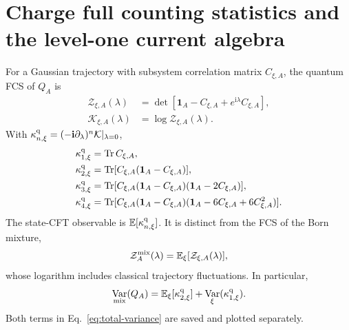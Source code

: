 \documentclass[aps,prx,twocolumn,floatfix,nofootinbib,superscriptaddress,longbibliography]{revtex4-2}
\DeclareMathOperator{\Var}{Var}
\newcommand{\ii}{\boldsymbol{\mathrm{i}}}
\newcommand{\mc}[1]{\mathcal{#1}}
\newcommand{\E}{\mathbb{E}}
\newcommand{\qTr}{\operatorname{Tr}}
\begin{document}
\section{Charge full counting statistics and the level-one current algebra}
\label{app:fcs}

For a Gaussian trajectory with subsystem correlation matrix $C_{\xi,A}$, the quantum FCS
of $Q_A$ is
\begin{equation}
 \begin{aligned}
 \mc Z_{\xi,A}(\lambda)
 &=\det\!\left[\mathbf{1}_A-C_{\xi,A}+e^{\ii\lambda}C_{\xi,A}\right],\\
 \mc K_{\xi,A}(\lambda)&=\log\mc Z_{\xi,A}(\lambda).
 \end{aligned}
\end{equation}
With $\kappa_{n,\xi}^{\rm q}=(-\ii\partial_\lambda)^n\mc K|_{\lambda=0}$,
\begin{align}
 \kappa_{1,\xi}^{\rm q}&=\qTr C_{\xi,A},\\
 \kappa_{2,\xi}^{\rm q}&=\qTr[C_{\xi,A}(\mathbf{1}_A-C_{\xi,A})],\\
 \kappa_{3,\xi}^{\rm q}&=\qTr[C_{\xi,A}(\mathbf{1}_A-C_{\xi,A})(\mathbf{1}_A-2C_{\xi,A})],\\
 \kappa_{4,\xi}^{\rm q}&=\qTr[C_{\xi,A}(\mathbf{1}_A-C_{\xi,A})
 (\mathbf{1}_A-6C_{\xi,A}+6C_{\xi,A}^2)].
\end{align}
The state-CFT observable is $\E[\kappa_{n,\xi}^{\rm q}]$.  It is distinct from the FCS of
the Born mixture,
\begin{equation}
 \mc Z_A^{\rm mix}(\lambda)=\E_\xi[\mc Z_{\xi,A}(\lambda)],
\end{equation}
whose logarithm includes classical trajectory fluctuations.  In particular,
\begin{equation}
 \Var_{\rm mix}(Q_A)=
 \E_\xi[\kappa_{2,\xi}^{\rm q}]
 +\Var_\xi(\kappa_{1,\xi}^{\rm q}).
 \label{eq:total-variance}
\end{equation}
Both terms in Eq.~\eqref{eq:total-variance} are saved and plotted separately.
\end{document}
